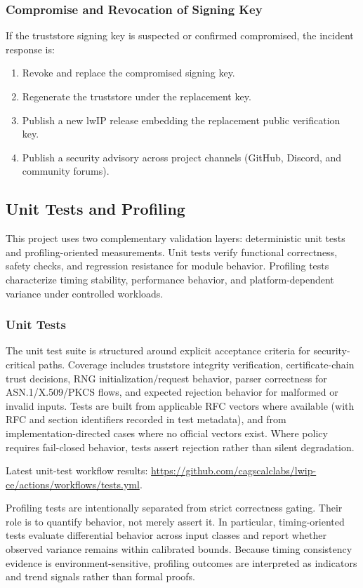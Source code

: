 \documentclass[titlepage]{report}
\begin{document}
	\subsubsection{Compromise and Revocation of Signing Key}
	If the truststore signing key is suspected or confirmed compromised, the incident response is:
	\begin{enumerate}
		\item Revoke and replace the compromised signing key.
		\item Regenerate the truststore under the replacement key.
		\item Publish a new lwIP release embedding the replacement public verification key.
		\item Publish a security advisory across project channels (GitHub, Discord, and community forums).
	\end{enumerate}

	
	\subsection{Unit Tests and Profiling}
	
	This project uses two complementary validation layers: deterministic unit tests and profiling-oriented measurements. Unit tests verify functional correctness, safety checks, and regression resistance for module behavior. Profiling tests characterize timing stability, performance behavior, and platform-dependent variance under controlled workloads.
	
	\subsubsection{Unit Tests}
	The unit test suite is structured around explicit acceptance criteria for security-critical paths. Coverage includes truststore integrity verification, certificate-chain trust decisions, RNG initialization/request behavior, parser correctness for ASN.1/X.509/PKCS flows, and expected rejection behavior for malformed or invalid inputs. Tests are built from applicable RFC vectors where available (with RFC and section identifiers recorded in test metadata), and from implementation-directed cases where no official vectors exist. Where policy requires fail-closed behavior, tests assert rejection rather than silent degradation.

	Latest unit-test workflow results: \url{https://github.com/cagscalclabs/lwip-ce/actions/workflows/tests.yml}.
	
	Profiling tests are intentionally separated from strict correctness gating. Their role is to quantify behavior, not merely assert it. In particular, timing-oriented tests evaluate differential behavior across input classes and report whether observed variance remains within calibrated bounds. Because timing consistency evidence is environment-sensitive, profiling outcomes are interpreted as indicators and trend signals rather than formal proofs.
	
\end{document}
